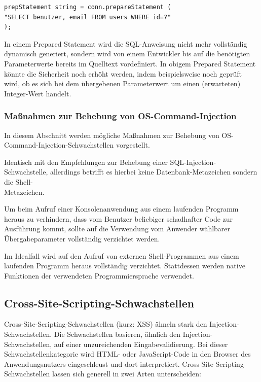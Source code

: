 \begin{lstlisting}[basicstyle=\ttfamily\footnotesize]
prepStatement string = conn.prepareStatement (
"SELECT benutzer, email FROM users WHERE id=?"
);
\end{lstlisting}

In einem Prepared Statement wird die SQL-Anweisung nicht mehr 
vollständig dynamisch generiert, sondern wird von einem Entwickler 
bis auf die benötigten Parameterwerte bereits im Quelltext vordefiniert. 
In obigem Prepared Statement könnte die Sicherheit noch erhöht werden, 
indem beispielsweise noch geprüft wird, ob es sich bei dem übergebenen 
Parameterwert um einen (erwarteten) Integer-Wert handelt.

\subsubsection{Maßnahmen zur Behebung von OS-Command-Injection}

In diesem Abschnitt werden mögliche Maßnahmen zur Behebung von 
OS-Command-Injection-Schwachstellen vorgestellt.


Identisch mit den Empfehlungen zur Behebung einer SQL-Injection-Schwachstelle, 
allerdings betrifft es hierbei keine Datenbank-Metazeichen sondern die 
Shell-\\Metazeichen.

\newpage
{}

Um beim Aufruf einer Konsolenanwendung aus einem laufenden Programm 
heraus zu verhindern, dass vom Benutzer beliebiger schadhafter Code zur 
Ausführung kommt, sollte auf die Verwendung vom Anwender wählbarer 
Übergabeparameter vollständig verzichtet werden.


Im Idealfall wird auf den Aufruf von externen Shell-Programmen aus einem 
laufenden Programm heraus vollständig verzichtet. Stattdessen werden 
native Funktionen der verwendeten Programmiersprache verwendet.


\subsection{Cross-Site-Scripting-Schwachstellen}

Cross-Site-Scripting-Schwachstellen (kurz: XSS) ähneln stark den 
Injection-Schwachstellen. Die Schwachstellen basieren, ähnlich den 
Injection-Schwachstellen, auf einer unzureichenden Eingabevalidierung. 
Bei dieser Schwachstellenkategorie wird HTML- oder JavaScript-Code in den 
Browser des Anwendungsnutzers eingeschleust und dort interpretiert. 
Cross-Site-Scripting-Schwachstellen lassen sich generell in zwei 
Arten unterscheiden:


